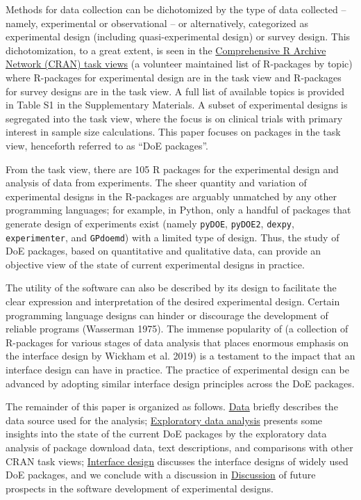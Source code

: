 Methods for data collection can be dichotomized by the type of data collected -- namely, experimental or observational -- or alternatively, categorized as experimental design (including quasi-experimental design) or survey design. This dichotomization, to a great extent, is seen in the \href{https://cran.r-project.org/web/views/}{Comprehensive R Archive Network (CRAN) task views} (a volunteer maintained list of R-packages by topic) where R-packages for experimental design are in the  task view and R-packages for survey designs are in the  task view. A full list of available topics is provided in Table S1 in the Supplementary Materials. A subset of experimental designs is segregated into the  task view, where the focus is on clinical trials with primary interest in sample size calculations. This paper focuses on packages in the  task view, henceforth referred to as ``DoE packages''.

From the  task view, there are 105 R packages for the experimental design and analysis of data from experiments. The sheer quantity and variation of experimental designs in the R-packages are arguably unmatched by any other programming languages; for example, in Python, only a handful of packages that generate design of experiments exist (namely \texttt{pyDOE}, \texttt{pyDOE2}, \texttt{dexpy}, \texttt{experimenter}, and \texttt{GPdoemd}) with a limited type of design. Thus, the study of DoE packages, based on quantitative and qualitative data, can provide an objective view of the state of current experimental designs in practice.

The utility of the software can also be described by its design to facilitate the clear expression and interpretation of the desired experimental design. Certain programming language designs can hinder or discourage the development of reliable programs (Wasserman 1975). The immense popularity of  (a collection of R-packages for various stages of data analysis that places enormous emphasis on the interface design by Wickham et al. 2019) is a testament to the impact that an interface design can have in practice. The practice of experimental design can be advanced by adopting similar interface design principles across the DoE packages.

The remainder of this paper is organized as follows. \hyperref[data]{Data} briefly describes the data source used for the analysis; \hyperref[eda]{Exploratory data analysis} presents some insights into the state of the current DoE packages by the exploratory data analysis of package download data, text descriptions, and comparisons with other CRAN task views; \hyperref[design]{Interface design} discusses the interface designs of widely used DoE packages, and we conclude with a discussion in \hyperref[discussion]{Discussion} of future prospects in the software development of experimental designs.

